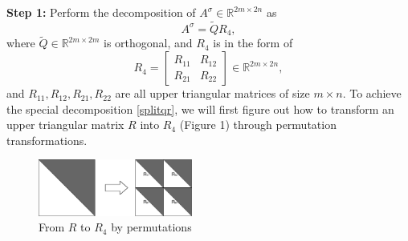 \documentclass{book}
\makeatletter
\def\my@tag@font{\normalsize}
\let\amsmath@eqref\eqref
\renewcommand\eqref[1]{{\let\my@tag@font\relax\amsmath@eqref{#1}}}
\theoremstyle{remark}
\makeatother
\begin{document}
\begin{multicols}{2}
\textbf{Step 1:} Perform the decomposition of $A^\sigma \in \mathbb{R}^{2m \times 2n}$ as 
\begin{equation}\label{splitqr}
A^\sigma = \widetilde{Q} R_4,
\end{equation} 
where $\widetilde{Q} \in \mathbb{R}^{2m\times 2m}$ is orthogonal, and $R_4  $ is in the form of 
\begin{equation}\label{r4}
R_4 = \begin{bmatrix}
    R_{11} & R_{12} \\
    R_{21} & R_{22}
\end{bmatrix} \in \mathbb{R}^{2m \times 2n},
\end{equation}
and $R_{11}, R_{12},R_{21},R_{22}$ are all upper triangular matrices of size $m \times n$. To achieve the special decomposition \eqref{splitqr}, we will first  figure out how to  transform an upper triangular matrix $R$ into $R_4$ (Figure 1) through permutation transformations.
\begin{figure}[htbp]
        \centering
        \includegraphics[width=0.45\textwidth,keepaspectratio=true]{Figure_1.png} %
        \caption{From $R$ to $R_4$ by permutations }
        \label{fig:Figure_1}
\end{figure}


\end{multicols}
\end{document}
